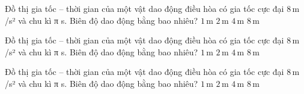 \begin{ex}
Đồ thị gia tốc – thời gian của một vật dao động điều hòa có gia tốc cực đại $8\,\text{m}$ /s² và chu kì π s. Biên độ dao động bằng bao nhiêu?
\choice
{$1\,\text{m}$}
{\True $2\,\text{m}$}
{$4\,\text{m}$}
{$8\,\text{m}$}
\end{ex}

\begin{ex}
Đồ thị gia tốc – thời gian của một vật dao động điều hòa có gia tốc cực đại $8\,\text{m}$ /s² và chu kì π s. Biên độ dao động bằng bao nhiêu?
\choice
{$1\,\text{m}$}
{\True $2\,\text{m}$}
{$4\,\text{m}$}
{$8\,\text{m}$}
\end{ex}

\begin{ex}
Đồ thị gia tốc – thời gian của một vật dao động điều hòa có gia tốc cực đại $8\,\text{m}$ /s² và chu kì π s. Biên độ dao động bằng bao nhiêu?
\choice
{$1\,\text{m}$}
{\True $2\,\text{m}$}
{$4\,\text{m}$}
{$8\,\text{m}$}
\end{ex}
